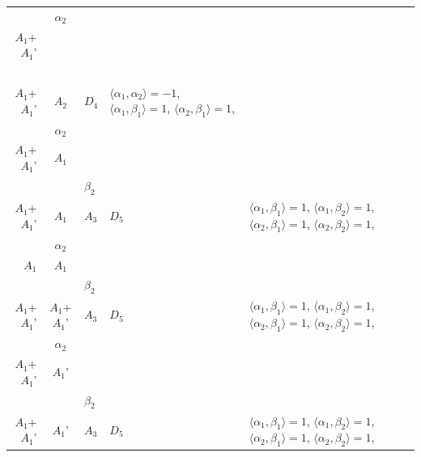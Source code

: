\documentclass[12pt]{report}
\begin{document}
\begin{appendix}
{\begin{longtable}{rcl p{1cm}p{1cm}p{3cm} }
\\
\begin{tabular}{cc}$\alpha_1$+ & $\alpha_2$\\\tiny{ $A_1$+$A_1$' } & \tiny{  }\end{tabular} &\begin{tabular}{c} = \\~ \end{tabular} & \begin{tabular}{c}$\beta_1$\\\tiny{ $A_1$+$A_1$' }\end{tabular} & $A_2$ & $D_4$ & $\langle\alpha_1, \alpha_2\rangle=-1$,  $\langle\alpha_1, \beta_1\rangle=1$, $\langle\alpha_2, \beta_1\rangle=1$, 
\\
\begin{tabular}{cc}$\alpha_1$+ & $\alpha_2$\\\tiny{ $A_1$+$A_1$' } & \tiny{ $A_1$ }\end{tabular} &\begin{tabular}{c} = \\~ \end{tabular} & \begin{tabular}{cc}$\beta_1$+ & $\beta_2$\\\tiny{ $A_1$+$A_1$' } & \tiny{ $A_1$ }\end{tabular} & $A_3$ & $D_5$ &  $\langle\alpha_1, \beta_1\rangle=1$, $\langle\alpha_1, \beta_2\rangle=1$, $\langle\alpha_2, \beta_1\rangle=1$, $\langle\alpha_2, \beta_2\rangle=1$, 
\\
\begin{tabular}{cc}$\alpha_1$+ & $\alpha_2$\\\tiny{ $A_1$ } & \tiny{ $A_1$ }\end{tabular} &\begin{tabular}{c} = \\~ \end{tabular} & \begin{tabular}{cc}$\beta_1$+ & $\beta_2$\\\tiny{ $A_1$+$A_1$' } & \tiny{ $A_1$+$A_1$' }\end{tabular} & $A_3$ & $D_5$ &  $\langle\alpha_1, \beta_1\rangle=1$, $\langle\alpha_1, \beta_2\rangle=1$, $\langle\alpha_2, \beta_1\rangle=1$, $\langle\alpha_2, \beta_2\rangle=1$, 
\\
\begin{tabular}{cc}$\alpha_1$+ & $\alpha_2$\\\tiny{ $A_1$+$A_1$' } & \tiny{ $A_1$' }\end{tabular} &\begin{tabular}{c} = \\~ \end{tabular} & \begin{tabular}{cc}$\beta_1$+ & $\beta_2$\\\tiny{ $A_1$+$A_1$' } & \tiny{ $A_1$' }\end{tabular} & $A_3$ & $D_5$ &  $\langle\alpha_1, \beta_1\rangle=1$, $\langle\alpha_1, \beta_2\rangle=1$, $\langle\alpha_2, \beta_1\rangle=1$, $\langle\alpha_2, \beta_2\rangle=1$, 

\end{longtable}}
\end{appendix}
\end{document}
